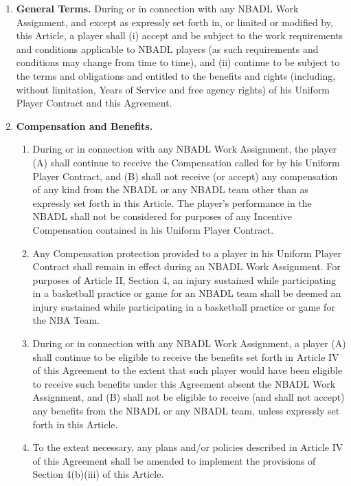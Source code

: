 \documentclass[
]{book}
\providecommand{\tightlist}{%
  \setlength{\itemsep}{0pt}\setlength{\parskip}{0pt}}
\begin{document}
\begin{enumerate}
\def\labelenumi{(\alph{enumi})}
\tightlist
\item
  \textbf{General Terms.} During or in connection with any NBADL
  Work Assignment, and except as expressly set forth in, or limited or
  modified by, this Article, a player shall (i) accept and be subject to the work requirements and conditions applicable to NBADL players (as such requirements and conditions may change from time to time), and (ii) continue to be subject to the terms and obligations and entitled to the benefits and rights (including, without limitation, Years of Service and free agency rights) of his Uniform Player Contract and this Agreement.
\item
  \textbf{Compensation and Benefits.}

  \begin{enumerate}
  \def\labelenumii{(\roman{enumii})}
  \tightlist
  \item
    During or in connection with any NBADL Work Assignment, the player (A) shall continue to receive the Compensation called for by his Uniform Player Contract, and (B) shall not receive (or accept) any compensation of any kind from the NBADL or any NBADL team other than as expressly set forth in this Article. The player's performance in the NBADL shall not be considered for purposes of any Incentive Compensation contained in his Uniform Player Contract.
  \item
    Any Compensation protection provided to a player in his Uniform Player Contract shall remain in effect during an NBADL Work Assignment. For purposes of Article II, Section 4, an injury sustained while participating in a basketball practice or game for an NBADL team shall be deemed an injury sustained while participating in a basketball practice or game for the NBA Team.
  \item
    During or in connection with any NBADL Work Assignment, a player (A) shall continue to be eligible to receive the benefits set forth in Article IV of this Agreement to the extent that such player would have been eligible to receive such benefits under this Agreement absent the NBADL Work Assignment, and (B) shall not be eligible to receive (and shall not accept) any benefits from the NBADL or any NBADL team, unless expressly set forth in this Article.
  \item
    To the extent necessary, any plans and/or policies described in Article IV of this Agreement shall be amended to implement the provisions of Section 4(b)(iii) of this Article.

\end{enumerate}
\end{enumerate}
\end{document}
